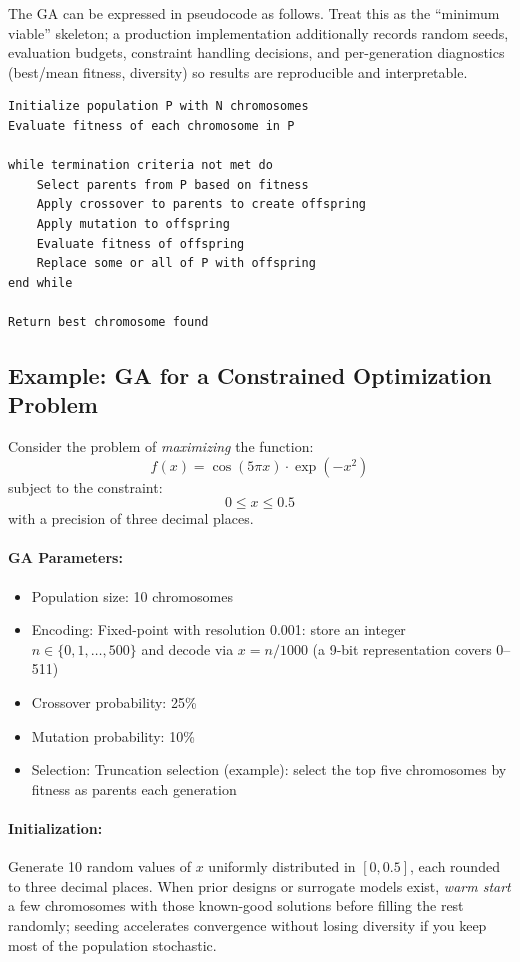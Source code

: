 The GA can be expressed in pseudocode as follows. Treat this as the ``minimum viable'' skeleton; a production implementation additionally records random seeds, evaluation budgets, constraint handling decisions, and per-generation diagnostics (best/mean fitness, diversity) so results are reproducible and interpretable.

\begin{verbatim}
Initialize population P with N chromosomes
Evaluate fitness of each chromosome in P

while termination criteria not met do
    Select parents from P based on fitness
    Apply crossover to parents to create offspring
    Apply mutation to offspring
    Evaluate fitness of offspring
    Replace some or all of P with offspring
end while

Return best chromosome found
\end{verbatim}

\subsection{Example: GA for a Constrained Optimization Problem}
\label{sec:evo_example_ga_for_a_constrained_optimization_problem}

Consider the problem of \emph{maximizing} the function:
\[
f(x) = \cos(5 \pi x) \cdot \exp(-x^2)
\]
subject to the constraint:
\[
0 \leq x \leq 0.5
\]
with a precision of three decimal places.

\paragraph{GA Parameters:}
\begin{itemize}
    \item Population size: 10 chromosomes
    \item Encoding: Fixed-point with resolution 0.001: store an integer \(n\in\{0,1,\ldots,500\}\) and decode via \(x=n/1000\) (a 9-bit representation covers 0--511)
    \item Crossover probability: 25\%
    \item Mutation probability: 10\%
    \item Selection: Truncation selection (example): select the top five chromosomes by fitness as parents each generation
\end{itemize}

\paragraph{Initialization:}
Generate 10 random values of \(x\) uniformly distributed in \([0, 0.5]\), each rounded to three decimal places. When prior designs or surrogate models exist, \emph{warm start} a few chromosomes with those known-good solutions before filling the rest randomly; seeding accelerates convergence without losing diversity if you keep most of the population stochastic.

